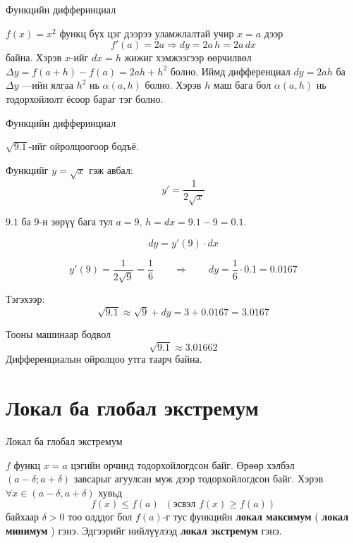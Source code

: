 \begin{frame}[allowframebreaks]{Функцийн дифферинциал}
\begin{example}
  \(f(x)=x^2\) функц бүх цэг дээрээ уламжлалтай учир \(x=a\) дээр
\[
f'(a)=2a\Rightarrow  dy = 2a\,h=2a \,dx
\] байна. 
Хэрэв \(x\)-ийг \(dx=h\)  жижиг хэмжээгээр өөрчилвөл \( \Delta y = f(a+h)-f(a)=2a h + h^2\) болно. Иймд дифференциал \(dy=2a h\) ба \( \Delta y \) —ийн ялгаа \(h^2\) нь $\alpha(a,h)$ болно. Хэрэв $h$ маш бага бол $\alpha(a,h)$ нь тодорхойлолт ёсоор бараг тэг болно.
\end{example} 
\end{frame}

\begin{frame}[allowframebreaks]{Функцийн дифферинциал}
\begin{example}
$\sqrt{9.1}$-ийг ойролцоогоор бодъё.

Функцийг $y=\sqrt{x}$ гэж авбал:
\[
y' = \frac{1}{2\sqrt{x}}
\]

$9.1$ ба $9$-н зөрүү бага тул $a=9$, $h=dx = 9.1-9 = 0.1$.

\[
dy = y'(9)\cdot dx
\]

\[
y'(9) = \frac{1}{2\sqrt{9}} = \frac{1}{6}
\qquad \Rightarrow \qquad
dy = \frac{1}{6}\cdot 0.1 = 0.0167
\]

Тэгэхээр:
\[
\sqrt{9.1} \approx \sqrt{9}+dy = 3 + 0.0167 = 3.0167
\]

Тооны машинаар бодвол
\[
\sqrt{9.1} \approx 3.01662
\]
Дифференциалын ойролцоо утга таарч байна.
\end{example}
\end{frame}

\section{Локал ба глобал экстремум}
\begin{frame}[allowframebreaks]{Локал ба глобал экстремум}
\begin{definition}
$f$ функц $x=a$ цэгийн орчинд тодорхойлогдсон байг. Өрөөр хэлбэл $(a-\delta;a+\delta)$ завсарыг агуулсан муж дээр тодорхойлогдсон байг. Хэрэв $\forall x\in(a-\delta,a+\delta)$ хувьд 
\[
f(x)\le f(a)\;\;(\text{эсвэл } f(x)\ge f(a))
\] байхаар $\delta>0$ тоо олддог бол $f(a)$-г тус функцийн \textbf{локал максимум} ( \textbf{локал минимум} ) гэнэ. Эдгээрийг нийлүүлээд \textbf{локал экстремум} гэнэ.
\end{definition}
\end{frame}

